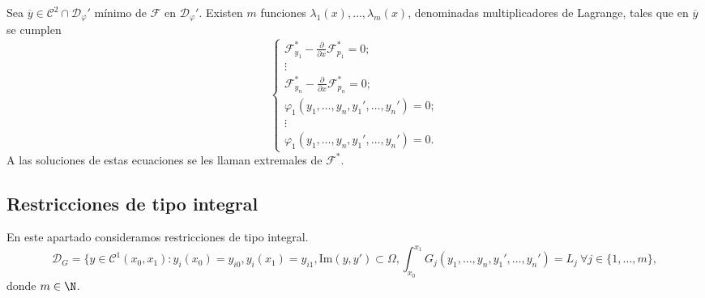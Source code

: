 \documentclass{article}
\begin{document}
\begin{prop} \label{prop:ml:ad}
  Sea $\overline{y} \in \mathcal{C}^2 \cap \mathcal{D}_\varphi'$ mínimo de $\mathcal{F}$ en
  $\mathcal{D}_\varphi'$. Existen $m$ funciones $\lambda_1(x), \ldots, \lambda_m(x)$, denominadas
  multiplicadores de Lagrange, tales que en $\overline{y}$ se cumplen
  \[
    \begin{cases}
      \mathcal{F}_{y_1}^* - \frac{\partial}{\partial x} \mathcal{F}_{p_1}^* = 0; \\
      \vdots \\
      \mathcal{F}_{y_n}^* - \frac{\partial}{\partial x} \mathcal{F}_{p_n}^* = 0; \\
      \varphi_1(y_1, \dots, y_n, y_1', \ldots, y_n') = 0; \\
      \vdots \\
      \varphi_1(y_1, \dots, y_n, y_1', \ldots, y_n') = 0.
    \end{cases}
  \]
  A las soluciones de estas ecuaciones se les llaman extremales de $\mathcal{F}^*$.
\end{prop}

\subsection{Restricciones de tipo integral}

En este apartado consideramos restricciones de tipo integral.
\[\mathcal{D}_G = \{y \in \mathcal{C}^1(x_0, x_1): y_i(x_0) = y_{i0}, y_i(x_1) = y_{i1},
  \mathrm{Im}(y, y') \subset \Omega, \int_{x_0}^{x_1}G_j(y_1, \ldots, y_n, y_1', \ldots, y_n') = L_j
  \ \forall j \in \{1, \ldots, m\},\] donde $m \in \N$.
\end{document}
